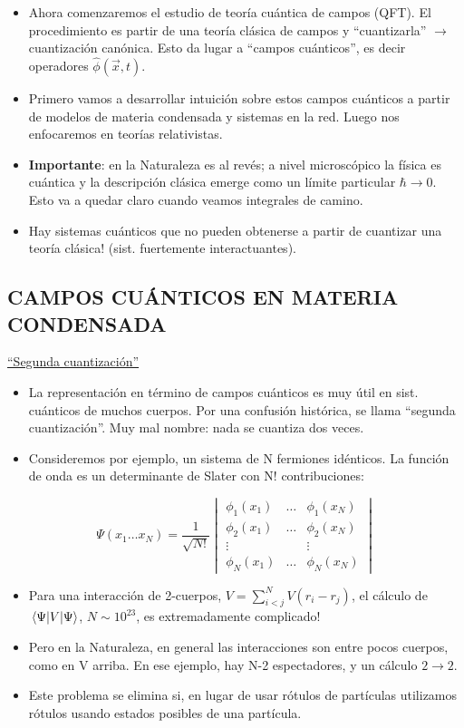 \begin{itemize}
    \item Ahora comenzaremos el estudio de teoría cuántica de campos (QFT). El procedimiento es partir de una teoría clásica de campos y ``cuantizarla'' $\rightarrow$ cuantización canónica. Esto da lugar a ``campos cuánticos'', es decir operadores $\hat{\phi}(\vec{x},t)$.
    \item Primero vamos a desarrollar intuición sobre estos campos cuánticos a partir de modelos de materia condensada y sistemas en la red. Luego nos enfocaremos en teorías relativistas.
    \item[*] \textbf{Importante}: en la Naturaleza es al revés; a nivel microscópico la física es cuántica y la descripción clásica emerge como un límite particular $\hbar \rightarrow 0$. Esto va a quedar claro cuando veamos integrales de camino.
    \item[*] Hay sistemas cuánticos que no pueden obtenerse a partir de cuantizar una teoría clásica! (sist. fuertemente interactuantes).
\end{itemize}

\subsection{CAMPOS CUÁNTICOS EN MATERIA CONDENSADA}

\vspace{0.5cm}
\noindent \underline{``Segunda cuantización''}
\begin{itemize}
    \item La representación en término de campos cuánticos es muy útil en sist. cuánticos de muchos cuerpos. Por una confusión histórica, se llama ``segunda cuantización''. Muy mal nombre: nada se cuantiza dos veces.
    \item Consideremos por ejemplo, un sistema de N fermiones idénticos. La función de onda es un determinante de Slater con N! contribuciones:
\end{itemize}
$$ \Psi(x_1 \dots x_N) = \frac{1}{\sqrt{N!}} \begin{vmatrix} \phi_1(x_1) & \dots & \phi_1(x_N) \\ \phi_2(x_1) & \dots & \phi_2(x_N) \\ \vdots & & \vdots \\ \phi_N(x_1) & \dots & \phi_N(x_N) \end{vmatrix} $$
\begin{itemize}
    \item Para una interacción de 2-cuerpos, $V = \sum_{i<j}^N V(r_i - r_j)$, el cálculo de $\matrixel{\Psi}{V}{\Psi}$, $N \sim 10^{23}$, es extremadamente complicado!
    \item Pero en la Naturaleza, en general las interacciones son entre pocos cuerpos, como en V arriba. En ese ejemplo, hay N-2 espectadores, y un cálculo $2 \rightarrow 2$.
    \item[$\Rightarrow$] Este problema se elimina si, en lugar de usar rótulos de partículas utilizamos rótulos usando estados posibles de una partícula.
\end{itemize}

